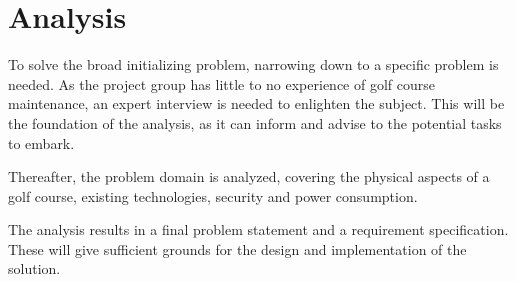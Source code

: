 
\chapter{Analysis}
To solve the broad initializing problem, narrowing down to a specific problem is needed. As the project group has little to no experience of golf course maintenance, an expert interview is needed to enlighten the subject. This will be the foundation of the analysis, as it can inform and advise to the potential tasks to embark.

Thereafter, the problem domain is analyzed, covering the physical aspects of a golf course, existing technologies, security and power consumption.

The analysis results in a final problem statement and a requirement specification. These will give sufficient grounds for the design and implementation of the solution.


% 





